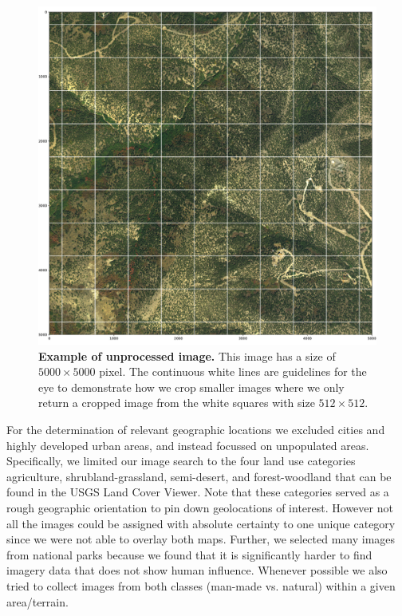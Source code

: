 \begin{figure}[h!]
	\centering
	\captionsetup{width=1\linewidth}
	\includegraphics[width=1\textwidth]{Figures/example_unproc.pdf}
	\caption{\textbf{Example of unprocessed image.} This image has a size of $5000\times5000$ pixel. The continuous white lines are guidelines for the eye to demonstrate how we crop smaller images where we only return a cropped image from the white squares with size $512\times512$.}
	\label{fig:example-unproc}
\end{figure}

For the determination of relevant geographic locations we excluded cities and highly developed urban areas, and instead focussed on unpopulated areas. Specifically, we limited our image search to the four land use categories agriculture, shrubland-grassland, semi-desert, and forest-woodland that can be found in the USGS Land Cover Viewer. Note that these categories served as a rough geographic orientation to pin down geolocations of interest. However not all the images could be assigned with absolute certainty to one unique category since we were not able to overlay both maps. Further, we selected many images from national parks because we found that it is significantly harder to find imagery data that does not show human influence. Whenever possible we also tried to collect images from both classes (man-made vs. natural) within a given area/terrain.

